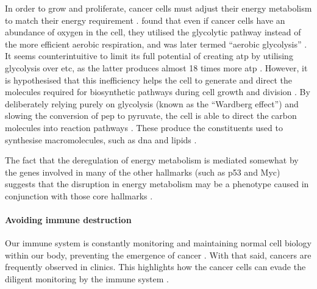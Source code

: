 \noindent
In order to grow and proliferate, cancer cells must adjust their energy metabolism to match their energy requirement \citep{Hanahan2011}.
\citet{Wardburg1956} found that even if cancer cells have an abundance of oxygen in the cell, they utilised the glycolytic pathway instead of the more efficient aerobic respiration, and was later termed ``aerobic glycolysis'' \citep{Hanahan2011}.
It seems counterintuitive to limit its full potential of creating \gls{atp} by utilising glycolysis over \gls{etc}, as the latter produces almost 18 times more \gls{atp} \citep{Hanahan2011, VanderHeiden2009}.
However, it is hypothesised  that this inefficiency helps the cell to generate and direct the molecules required for biosynthetic pathways during cell growth and division \citep{Cairns2011,VanderHeiden2009}.
By deliberately relying purely on glycolysis (known as the ``Wardberg effect'') and slowing the conversion of \gls{pep} to pyruvate, the cell is able to direct the carbon molecules into reaction pathways \citep{Cairns2011,VanderHeiden2009}.
These produce the constituents used to synthesise macromolecules, such as \acrshort{dna} and lipids \citep{Cairns2011,VanderHeiden2009}.

The fact that the deregulation of energy metabolism is mediated somewhat by the genes involved in many of the other hallmarks (such as p53 and Myc) suggests that the disruption in energy metabolism may be a phenotype caused in conjunction with those core hallmarks \citep{Hanahan2011}.

\paragraph{Avoiding immune destruction}

\noindent
Our immune system is constantly monitoring and maintaining normal cell biology within our body, preventing the emergence of cancer \citep{Hanahan2011}.
With that said, cancers are frequently observed in clinics.
This highlights how the cancer cells can evade the diligent monitoring by the immune system \citep{Hanahan2011}.

